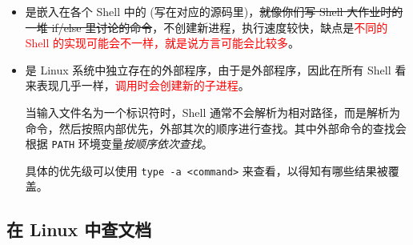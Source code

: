 \documentclass{article}
\begin{document}
	\begin{itemize}
		\item {}是嵌入在各个 Shell 中的 (写在对应的源码里)，\sout{就像你们写 Shell 大作业时的一堆 if/else 里讨论的命令}，\textcolor{green!80!black}{不创建新进程，执行速度较快}，缺点是\textcolor{red}{不同的 Shell 的实现可能会不一样，就是说方言可能会比较多}。
		\item {}是 Linux 系统中独立存在的外部程序，\textcolor{green!80!black}{由于是外部程序，因此在所有 Shell 看来表现几乎一样}，\textcolor{red}{调用时会创建新的子进程}。

			当输入文件名为一个标识符时，Shell 通常不会解析为相对路径，而是解析为命令，然后按照内部优先，外部其次的顺序进行查找。其中外部命令的查找会根据 \texttt{PATH} 环境变量\textit{按顺序依次查找}。

			具体的优先级可以使用 \texttt{type -a <command>} 来查看，以得知有哪些结果被覆盖。
	\end{itemize}

	\subsection{在 Linux 中查文档}
	\label{sss:linuxdoc}
\end{document}
